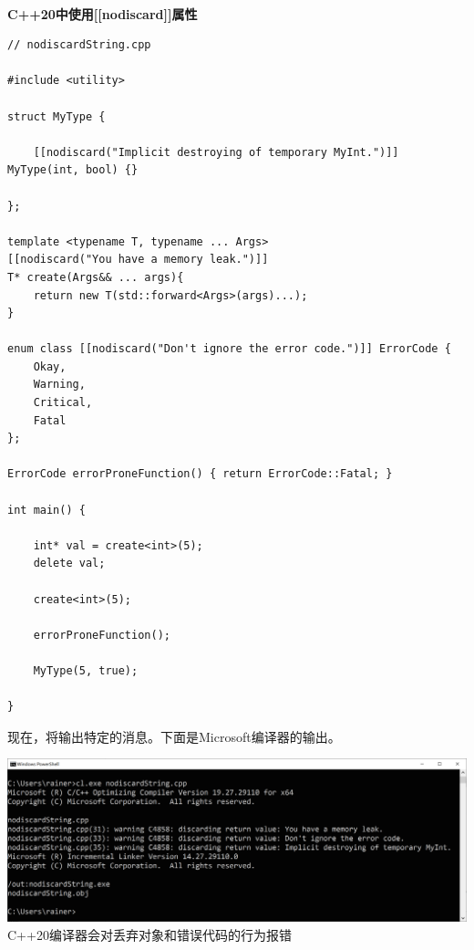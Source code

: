 \hspace*{\fill} \\ %
\noindent
\textbf{C++20中使用[[nodiscard]]属性}
\begin{lstlisting}[style=styleCXX]
// nodiscardString.cpp

#include <utility>

struct MyType {

	[[nodiscard("Implicit destroying of temporary MyInt.")]] MyType(int, bool) {}
	
};

template <typename T, typename ... Args>
[[nodiscard("You have a memory leak.")]]
T* create(Args&& ... args){
	return new T(std::forward<Args>(args)...);
}

enum class [[nodiscard("Don't ignore the error code.")]] ErrorCode {
	Okay,
	Warning,
	Critical,
	Fatal
};
 
ErrorCode errorProneFunction() { return ErrorCode::Fatal; }

int main() {

	int* val = create<int>(5);
	delete val;
	
	create<int>(5);
	
	errorProneFunction();
	
	MyType(5, true);

}
\end{lstlisting}

现在，将输出特定的消息。下面是Microsoft编译器的输出。

\begin{center}
\includegraphics[width=1.0\textwidth]{content/3/chapter4/images/46.png}\\
C++20编译器会对丢弃对象和错误代码的行为报错
\end{center}

